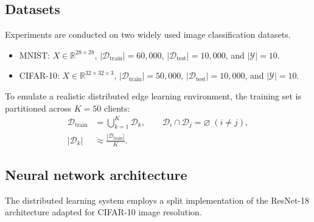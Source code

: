 \documentclass[10pt,journal]{IEEEtran}
\begin{document}
\subsection{Datasets}
Experiments are conducted on two widely used image classification datasets\cite{lecun1998gradient,Krizhevsky09learningmultiple}.
\begin{itemize}
    \item MNIST: $X\in\mathbb{R}^{28\times28}$, $|\mathcal{D}_{\mathrm{train}}|=60{,}000$, $|\mathcal{D}_{\mathrm{test}}|=10{,}000$, and $|\mathcal{Y}|=10$\cite{lecun1998gradient}.
    \item CIFAR-10: $X\in\mathbb{R}^{32\times32\times3}$, $|\mathcal{D}_{\mathrm{train}}|=50{,}000$, $|\mathcal{D}_{\mathrm{test}}|=10{,}000$, and $|\mathcal{Y}|=10$\cite{Krizhevsky09learningmultiple}.
\end{itemize}
To emulate a realistic distributed edge learning environment, the training set is partitioned across $K=50$ clients:
\begin{equation}
\begin{aligned}
\mathcal{D}_{\mathrm{train}}&=\bigcup_{k=1}^{K}\mathcal{D}_k,
\qquad
\mathcal{D}_i\cap\mathcal{D}_j=\varnothing\;(i\neq j), \\
|\mathcal{D}_k|&\approx\frac{|\mathcal{D}_{\mathrm{train}}|}{K}.
\end{aligned}
\end{equation}
\subsection{Neural network architecture}
The distributed learning system employs a split implementation of the ResNet-18 architecture adapted for CIFAR-10 image resolution\cite{he2016deepresidual}.
\end{document}
